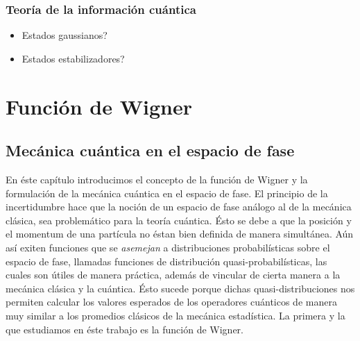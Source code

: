 \documentclass[a4paper]{report}
\begin{document}
  \subsection{Teoría de la información cuántica}

  \begin{itemize}
    \item Estados gaussianos?
    \item Estados estabilizadores?
  \end{itemize}

  \chapter{Función de Wigner}

  \section{Mecánica cuántica en el espacio de fase}

  En éste capítulo introducimos el concepto de la función de
  Wigner y la formulación de la mecánica cuántica en el
  espacio de fase. El principio de la incertidumbre hace que
  la noción de un espacio de fase análogo al de la mecánica
  clásica, sea problemático para la teoría cuántica. Ésto se
  debe a que la posición y el momentum de una partícula no
  éstan bien definida de manera simultánea. Aún así exiten
  funciones que se \textit{asemejan} a distribuciones
  probabilísticas sobre el espacio de fase, llamadas
  funciones de distribución quasi-probabilísticas, las
  cuales son útiles de manera práctica, además de vincular
  de cierta manera a la mecánica clásica y la cuántica. Ésto
  sucede porque dichas quasi-distribuciones nos permiten
  calcular los valores esperados de los operadores cuánticos
  de manera muy similar a los promedios clásicos de la
  mecánica estadística. La primera y la que estudiamos en
  éste trabajo es la función de Wigner.
\end{document}
